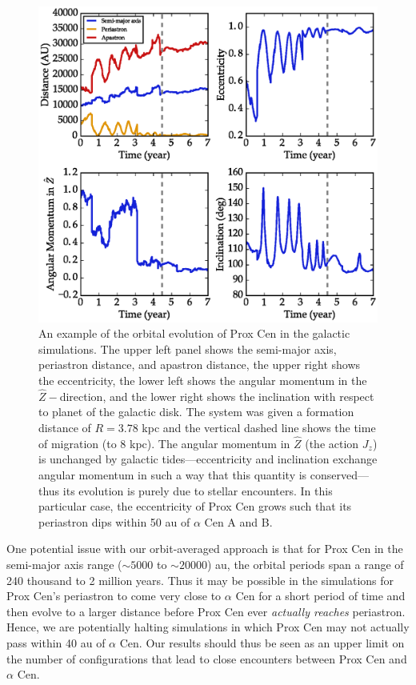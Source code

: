 \documentclass[preprint,12pt]{aastex}
\begin{document}
\begin{figure}
\includegraphics[width=\textwidth]{evol_Vpl_0257.eps}
\caption{An example of the orbital evolution of Prox Cen in the galactic 
  simulations. The upper left panel shows the semi-major axis, periastron 
  distance, and apastron distance, the upper right shows the eccentricity, 
  the lower left shows the angular momentum in the $\hat{Z}-$direction, 
  and the lower right shows the inclination with respect to planet of the 
  galactic disk. The system was given a formation distance of $R = 3.78$ 
  kpc and the vertical dashed line shows the time of migration (to 8 kpc). 
  The angular momentum in $\hat{Z}$ (the action $J_z$) is unchanged by 
  galactic tides---eccentricity and inclination exchange angular momentum 
  in such a way that this quantity is conserved---thus its evolution is purely 
  due to stellar encounters. In this particular case, the eccentricity of Prox Cen 
  grows such that its periastron dips within 50 au of $\alpha$ Cen A and B.}
\label{fig:galevolution}
\end{figure}

One potential issue with our orbit-averaged approach is that for Prox Cen in the 
semi-major axis range ($\sim5000$ to $\sim20000$) au, the orbital periods 
span a range of 240 thousand to 2 million years. Thus it may be possible in 
the simulations for Prox Cen's periastron to come very close to $\alpha$ Cen 
for a short period of time and then evolve to a larger distance before Prox Cen 
ever \emph{actually reaches} periastron. Hence, we are potentially halting 
simulations in which 
Prox Cen may not actually pass within 40 au of $\alpha$ Cen. Our results 
should thus be seen as an upper limit on the number of configurations 
that lead to close encounters between Prox Cen and $\alpha$ Cen.
 
\end{document}
